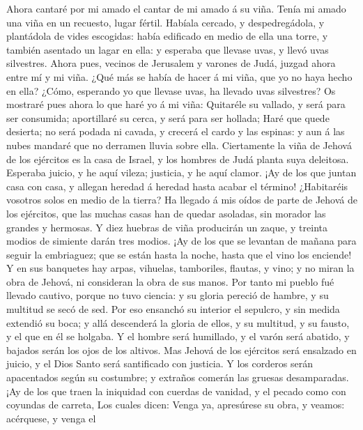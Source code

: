  Ahora cantaré por mi amado el cantar de mi amado á su viña.
Tenía mi amado una viña en un recuesto, lugar fértil. 
Habíala cercado, y despedregádola, y plantádola de vides escogidas:
había edificado en medio de ella una torre, y también asentado un lagar
en ella: y esperaba que llevase uvas, y llevó uvas silvestres.
 Ahora pues, vecinos de Jerusalem y varones de Judá, juzgad
ahora entre mí y mi viña.  ¿Qué más se había de hacer á mi
viña, que yo no haya hecho en ella? ¿Cómo, esperando yo que llevase
uvas, ha llevado uvas silvestres?  Os mostraré pues ahora lo
que haré yo á mi viña: Quitaréle su vallado, y será para ser consumida;
aportillaré su cerca, y será para ser hollada;  Haré que
quede desierta; no será podada ni cavada, y crecerá el cardo y las
espinas: y aun á las nubes mandaré que no derramen lluvia sobre ella.
 Ciertamente la viña de Jehová de los ejércitos es la casa
de Israel, y los hombres de Judá planta suya deleitosa. Esperaba juicio,
y he aquí vileza; justicia, y he aquí clamor.  ¡Ay de los
que juntan casa con casa, y allegan heredad á heredad hasta acabar el
término! ¿Habitaréis vosotros solos en medio de la tierra? 
Ha llegado á mis oídos de parte de Jehová de los ejércitos, que las
muchas casas han de quedar asoladas, sin morador las grandes y hermosas.
 Y diez huebras de viña producirán un zaque, y treinta
modios de simiente darán tres modios.  ¡Ay de los que se
levantan de mañana para seguir la embriaguez; que se están hasta la
noche, hasta que el vino los enciende!  Y en sus banquetes
hay arpas, vihuelas, tamboriles, flautas, y vino; y no miran la obra de
Jehová, ni consideran la obra de sus manos.  Por tanto mi
pueblo fué llevado cautivo, porque no tuvo ciencia: y su gloria pereció
de hambre, y su multitud se secó de sed.  Por eso ensanchó
su interior el sepulcro, y sin medida extendió su boca; y allá
descenderá la gloria de ellos, y su multitud, y su fausto, y el que en
él se holgaba.  Y el hombre será humillado, y el varón será
abatido, y bajados serán los ojos de los altivos.  Mas
Jehová de los ejércitos será ensalzado en juicio, y el Dios Santo será
santificado con justicia.  Y los corderos serán apacentados
según su costumbre; y extraños comerán las gruesas desamparadas.
 ¡Ay de los que traen la iniquidad con cuerdas de vanidad,
y el pecado como con coyundas de carreta,  Los cuales
dicen: Venga ya, apresúrese su obra, y veamos: acérquese, y venga el
